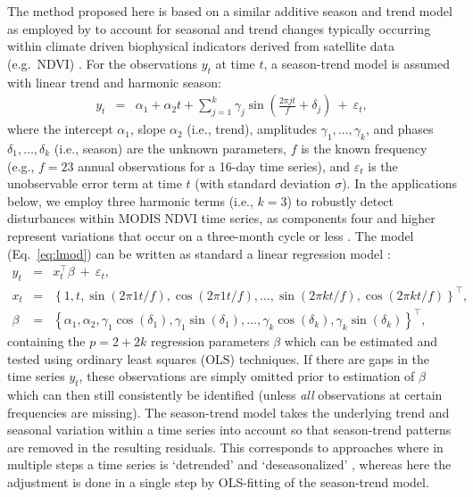 \documentclass[authoryear,preprint,review,10pt]{elsarticle}
\begin{document}
The method proposed here is based on a similar additive season and trend model as employed by \citet{Verbesselt:2010wo} to account for seasonal and trend changes typically occurring within climate driven biophysical indicators derived from satellite data (e.g.\ NDVI)  \citep{Beurs2005a}. For the observations $y_t$ at time $t$, a season-trend model is assumed with linear trend and harmonic season:
%
\begin{eqnarray} \label{eq:lmod}
  y_t & = & \alpha_1 + \alpha_2 t + \sum_{j = 1}^k \gamma_{j} \sin \left(\frac{2\pi j t}{f} + \delta_{j} \right) ~+~ \varepsilon_t,
\end{eqnarray}
%
where the intercept $\alpha_1$, slope $\alpha_2$ (i.e., trend), amplitudes $\gamma_1, \dots, \gamma_k$,
and phases $\delta_1, \dots, \delta_k$ (i.e., season) are the unknown parameters,
$f$ is the known frequency (e.g., $f = 23$ annual observations for a 16-day time series),
and $\varepsilon_t$ is the unobservable error term at time $t$ (with standard deviation $\sigma$). In the applications
below, we employ three harmonic terms (i.e., $k = 3$) to robustly detect disturbances within MODIS NDVI time series, as components four and higher represent variations
that occur on a three-month cycle or less \citep{Geerken2009,Julien2010}. The model (Eq.~\ref{eq:lmod}) can be written as standard a linear regression model \citep[see e.g.,][Chapter~3.3]{Cryer2008}:
%
\begin{eqnarray*} \label{eq:OLSlmod}
  y_t   & = & x_t^\top \beta ~+~ \varepsilon_t, \\
  x_t   & = & \left\{1, t, \sin(2 \pi 1 t / f), \cos(2 \pi 1 t / f),
              \dots, \sin(2 \pi k t / f), \cos(2 \pi k t / f)\right\}^\top, \\
  \beta & = & \left\{\alpha_1, \alpha_2, \gamma_1 \cos(\delta_1), \gamma_1 \sin(\delta_1),
              \dots, \gamma_k \cos(\delta_k), \gamma_k \sin(\delta_k)\right\}^\top,
\end{eqnarray*}
%
containing the $p = 2 + 2 k$ regression parameters $\beta$ which can be estimated and tested using ordinary least squares (OLS) techniques. 
If there are gaps in the time series $y_t$, these observations are simply omitted prior to estimation of $\beta$ which can then still consistently 
be identified (unless \emph{all} observations at certain frequencies are missing). The season-trend model takes the underlying trend and seasonal variation within a time series into account so that season-trend patterns are removed in the resulting residuals. This corresponds to approaches where in multiple steps a time series is `detrended' and `deseasonalized' \citep[e.g.][]{Potter2003}, whereas here the adjustment is done in a single step by OLS-fitting of the season-trend model.
\end{document}
